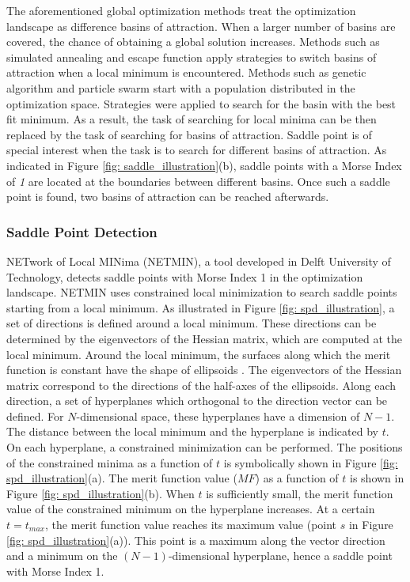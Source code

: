 The aforementioned global optimization methods treat the optimization landscape as difference basins of attraction. When a larger number of basins are covered, the chance of obtaining a global solution increases. Methods such as simulated annealing and escape function apply strategies to switch basins of attraction when a local minimum is encountered. Methods such as genetic algorithm and particle swarm start with a population distributed in the optimization space. Strategies were applied to search for the basin with the best fit minimum. As a result, the task of searching for local minima can be then replaced by the task of searching for basins of attraction. Saddle point is of special interest when the task is to search for different basins of attraction. As indicated in Figure \ref{fig: saddle_illustration}(b), saddle points with a Morse Index of \textit{1} are located at the boundaries between different basins. Once such a saddle point is found, two basins of attraction can be reached afterwards.

\subsubsection{Saddle Point Detection \label{method: spd}}

NETwork of Local MINima (NETMIN), a tool developed in Delft University of Technology, detects saddle points with Morse Index 1 in the optimization landscape. NETMIN uses constrained local minimization to search saddle points starting from a local minimum. As illustrated in Figure \ref{fig: spd_illustration}, a set of directions is defined around a local minimum. These directions can be determined by the eigenvectors of the Hessian matrix, which are computed at the local minimum. Around the local minimum, the surfaces along which the merit function is constant have the shape of ellipsoids \cite{MarinescuSPD07}. The eigenvectors of the Hessian matrix correspond to the directions of the half-axes of the ellipsoids. Along each direction, a set of hyperplanes which orthogonal to the direction vector can be defined. For $N$-dimensional space, these hyperplanes have a dimension of $N-1$. The distance between the local minimum and the hyperplane is indicated by $t$. On each hyperplane, a constrained minimization can be performed. The positions of the constrained minima as a function of  $t$ is symbolically shown in Figure \ref{fig: spd_illustration}(a). The merit function value ($MF$) as a function of $t$ is shown in Figure \ref{fig: spd_illustration}(b). When $t$ is sufficiently small, the merit function value of the constrained minimum on the hyperplane increases. At a certain $t = t_{max}$, the merit function value reaches its maximum value (point $s$ in Figure \ref{fig: spd_illustration}(a)). This point is a maximum along the vector direction and a minimum on the $(N-1)$-dimensional hyperplane, hence a saddle point with Morse Index 1.  

